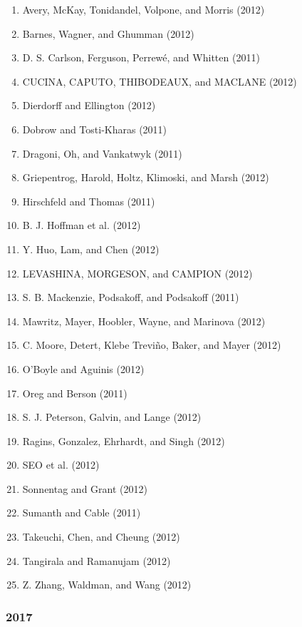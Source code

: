 \documentclass[english,man]{apa6}
\providecommand{\tightlist}{%
  \setlength{\itemsep}{0pt}\setlength{\parskip}{0pt}}
\theoremstyle{definition}
\theoremstyle{definition}
\theoremstyle{definition}
\theoremstyle{remark}
\begin{document}
\begin{enumerate}
\def\labelenumi{\arabic{enumi})}
\tightlist
\item
  Avery, McKay, Tonidandel, Volpone, and Morris (2012)
\item
  Barnes, Wagner, and Ghumman (2012)
\item
  D. S. Carlson, Ferguson, Perrewé, and Whitten (2011)
\item
  CUCINA, CAPUTO, THIBODEAUX, and MACLANE (2012)
\item
  Dierdorff and Ellington (2012)
\item
  Dobrow and Tosti-Kharas (2011)
\item
  Dragoni, Oh, and Vankatwyk (2011)
\item
  Griepentrog, Harold, Holtz, Klimoski, and Marsh (2012)
\item
  Hirschfeld and Thomas (2011)
\item
  B. J. Hoffman et al. (2012)
\item
  Y. Huo, Lam, and Chen (2012)
\item
  LEVASHINA, MORGESON, and CAMPION (2012)
\item
  S. B. Mackenzie, Podsakoff, and Podsakoff (2011)
\item
  Mawritz, Mayer, Hoobler, Wayne, and Marinova (2012)
\item
  C. Moore, Detert, Klebe Treviño, Baker, and Mayer (2012)
\item
  O'Boyle and Aguinis (2012)
\item
  Oreg and Berson (2011)
\item
  S. J. Peterson, Galvin, and Lange (2012)
\item
  Ragins, Gonzalez, Ehrhardt, and Singh (2012)
\item
  SEO et al. (2012)
\item
  Sonnentag and Grant (2012)
\item
  Sumanth and Cable (2011)
\item
  Takeuchi, Chen, and Cheung (2012)
\item
  Tangirala and Ramanujam (2012)
\item
  Z. Zhang, Waldman, and Wang (2012)
\end{enumerate}

\subsubsection{2017}\label{section-31}
\end{document}
